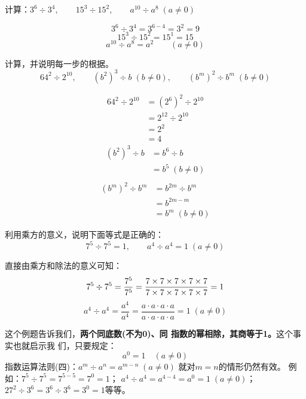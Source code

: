 \begin{example}
    计算：$3^6\div 3^4,\qquad 15^3\div 15^2,\qquad a^{10}\div a^8 \; (a\ne 0)$
\end{example}

\begin{solution}
    \[3^6\div 3^4=3^{6-4}=3^2=9 \]
    \[15^3\div 15^2=15^1=15\]
    \[a^{10}\div a^8=a^2\qquad (a\ne 0)\]
\end{solution}

\begin{example}
    计算，并说明每一步的根据。
\[64^2\div 2^{10},\qquad (b^2)^3\div b\; (b\ne 0),\qquad (b^m)^2\div b^m\; (b\ne 0) \]
\end{example}

\begin{solution}
\begin{align*}
    64^2\div 2^{10}&=(2^6)^2\div 2^{10} \tag{乘方的意义}\\
    &=2^{12}\div 2^{10} \tag{指数运算律（三）}\\
    &=2^2 \tag{指数运算律（四）}\\
    &=4\tag{乘方的意义}
\end{align*}    
\begin{align*}
    (b^2)^3\div b &=b^6\div b \tag{指数运算律（三）}\\
    &=b^5 \; (b\ne 0)\tag{指数运算律（四）}\\
\end{align*} 
\begin{align*}
    (b^m)^2\div b^m  &=b^{2m}\div b^m \tag{指数运算律（三）}\\
    &=b^{2m-m}\tag{指数运算律（四）}\\
    &=b^m \; (b\ne 0)
\end{align*} 
\end{solution}

\begin{example}
    利用乘方的意义，说明下面等式是正确的：
\[7^5\div 7^5=1,\qquad a^4\div a^4=1\; (a\ne 0) \]
\end{example}

\begin{solution}
    直接由乘方和除法的意义可知：
\[ 7^5\div 7^5=\dfrac{7^5}{7^5}=\dfrac{7\times7\times7\times7\times7}{7\times7\times7\times7\times7}=1 \]
\[a^4\div a^4=\frac{a^4}{a^4}=\frac{a\cdot a\cdot a\cdot a}{a\cdot a\cdot a\cdot a}=1\; (a\ne 0)\]
\end{solution}

这个例题告诉我们，\textbf{两个同底数(不为0)、同
指数的幂相除，其商等于1。}这个事实也就启示我
们，只要规定：
\[a^0=1\quad (a\ne 0) \]
指数运算法则(四)：$a^m\div a^n=a^{m-n}\; (a\ne 0)$
就对$m=n$的情形仍然有效。
例如：$7^5\div 7^5=7^{5-5}=7^0=1$；
$a^4\div a^4=a^{4-4}=a^0=1\; (a\ne 0)$；$27^2\div 3^6=3^6\div 3^6=3^0=1$等等。

